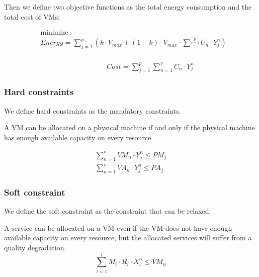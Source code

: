 Then we define two objective functions as the total energy consumption and the total cost of VMs:

\begin{equation}
\label{eq:energy}
\begin{aligned}
& {\text{minimize}}\\
& Energy = \sum\limits_{j=1}^p (k \cdot V_{max} + (1 - k) \cdot V_{max} \cdot \sum^v\limits_{n=1} U_n \cdot Y^n_j)\\
\end{aligned}
\end{equation}

\begin{equation}
\label{eq:cost}
\begin{aligned}
& & & & & & & Cost = \sum\limits_{j=1}^p\sum\limits_{n=1}^v C_n \cdot Y^n_j
\end{aligned}
\end{equation}

\subsubsection{Hard constraints}
We define hard constraints as the mandatory constraints.

A VM can be allocated on a physical machine if and 
only if the physical machine has enough available capacity on every resource.

\begin{equation} 
\label{eq:constraint}
\begin{aligned}
\sum\limits_{n=1}^v VM_n \cdot Y^n_j \leq PM_j\\
\sum\limits_{n=1}^v VA_n \cdot Y^n_j \leq PA_j
\end{aligned}
\end{equation}

\subsubsection{Soft constraint}
We define the soft constraint as the constraint that can be relaxed. 

A service can be allocated on a VM even if the 
VM does not have enough available capacity on every resource, but the allocated services will suffer from a quality degradation.
\begin{equation}
\sum\limits_{i=1}^t M_i \cdot R_i \cdot X_i^n  \leq VM_n
\end{equation}

